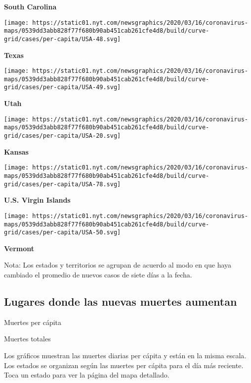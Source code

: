 \textbf{South Carolina}

\href{https://www.nytimes.com/interactive/2020/us/texas-coronavirus-cases.html}{}

\texttt{[image: https://static01.nyt.com/newsgraphics/2020/03/16/coronavirus-maps/0539dd3abb828f77f680b90ab451cab261cfe4d8/build/curve-grid/cases/per-capita/USA-48.svg]}

\textbf{Texas}

\href{https://www.nytimes.com/interactive/2020/us/utah-coronavirus-cases.html}{}

\texttt{[image: https://static01.nyt.com/newsgraphics/2020/03/16/coronavirus-maps/0539dd3abb828f77f680b90ab451cab261cfe4d8/build/curve-grid/cases/per-capita/USA-49.svg]}

\textbf{Utah}

\href{https://www.nytimes.com/interactive/2020/us/kansas-coronavirus-cases.html}{}

\texttt{[image: https://static01.nyt.com/newsgraphics/2020/03/16/coronavirus-maps/0539dd3abb828f77f680b90ab451cab261cfe4d8/build/curve-grid/cases/per-capita/USA-20.svg]}

\textbf{Kansas}

\texttt{[image: https://static01.nyt.com/newsgraphics/2020/03/16/coronavirus-maps/0539dd3abb828f77f680b90ab451cab261cfe4d8/build/curve-grid/cases/per-capita/USA-78.svg]}

\textbf{U.S. Virgin Islands}

\href{https://www.nytimes.com/interactive/2020/us/vermont-coronavirus-cases.html}{}

\texttt{[image: https://static01.nyt.com/newsgraphics/2020/03/16/coronavirus-maps/0539dd3abb828f77f680b90ab451cab261cfe4d8/build/curve-grid/cases/per-capita/USA-50.svg]}

\textbf{Vermont}

Nota: Los estados y territorios se agrupan de acuerdo al modo en que
haya cambiado el promedio de nuevos casos de siete días a la fecha.

\hypertarget{lugares-donde-las-nuevas-muertes-aumentan}{%
\subsection{Lugares donde las nuevas muertes
aumentan}\label{lugares-donde-las-nuevas-muertes-aumentan}}

Muertes per cápita

Muertes totales

Los gráficos muestran las muertes diarias per cápita y están en la misma
escala. Los estados se organizan según las muertes per cápita para el
día más reciente. Toca un estado para ver la página del mapa detallado.

